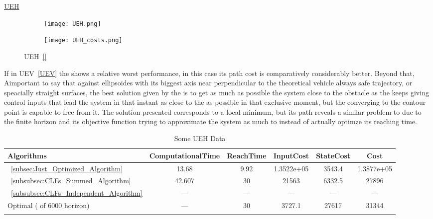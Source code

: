   \newpage %


\underline{UEH}
\label{UEH} %

 \begin{figure}[htbp]
  \begin{subfigure}{0.6\textwidth}
    \centering
    \texttt{[image: UEH.png]}
  \label{fig:UEH_CostEvol}
  \end{subfigure}
  \begin{subfigure}{0.59\textwidth}
    \centering
    \texttt{[image: UEH\_costs.png]}
  \label{fig:UEH_trajectory}
  \end{subfigure}
  \caption{UEH~\ref{}}
\label{fig:UEHTrajectory_and_CostEvol}
\end{figure}


If in UEV~\ref{UEV} the  shows a relative worst performance, in this case its path cost is comparatively considerably better. Beyond that, Aimportant to say that against ellipsoides with its biggest axis near perpendicular to the theoretical vehicle always safe trajectory, or speacially straight surfaces, the best solution given by the  is to get as much as possible the system close to the obstacle as the  keeps giving control inputs that lead the system in that instant as close to the \txtref as possible in that exclusive moment, but the  converging to the contour point is capable to free from it. The  solution presented corresponds to a local minimum, but its path reveals a similar problem to  due to the finite horizon and its objective function trying to approximate the system as much to \txtref instead of actually optimze its reaching time.


\bgroup
 \begin{xltabular}{\textwidth}{|l|ccccc|}
   \toprule
   Algorithms   & ComputationalTime  & ReachTime  & InputCost   & StateCost & Cost           \\
   \midrule
    ~\ref{subsec:Just_Optimized_Algorithm}           & 13.68  & 9.92  & 1.3522e+05 & 3543.4 & 1.3877e+05 \\
    ~\ref{subsubsec:CLFs_Summed_Algorithm}        & 42.607  & 30     & 21563 & 6332.5 & 27896 \\
    ~\ref{subsubsec:CLFs_Independent_Algorithm}   & ---   & ---      & ---  & ---  & ---  \\
    Optimal ( of 6000 horizon)                        & ---    & 30 & 3727.1  & 27617 & 31344 \\
    \midrule
    \caption{Some UEH Data}
   \label{tab:Some_UEH_Data}\\
   \end{xltabular}
 \egroup

